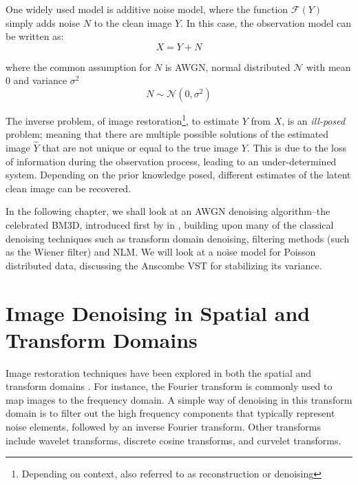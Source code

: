 One widely used model is additive noise model, where the function $\mathcal{F}(Y)$ simply adds noise $N$ to the clean image $Y$. In this case, the observation model can be written as:
\begin{equation}\label{eq:observation-model-additive}
    X = Y + N
\end{equation}

where the common assumption for $N$ is \gls{AWGN}, normal distributed $\mathcal{N}$ with mean \num{0} and variance $\sigma^2$
\begin{equation}\label{eq:awgn}
    N \sim \mathcal{N}(0, \sigma^2)
\end{equation}

The inverse problem, of image restoration\footnote{Depending on context, also referred to as reconstruction or denoising}, to estimate $Y$ from $X$, is an \textit{ill-posed} problem; meaning that there are multiple possible solutions of the estimated image $\hat{Y}$ that are not unique or equal to the true image $Y$. This is due to the loss of information during the observation process, leading to an under-determined system. Depending on the prior knowledge posed, different estimates of the latent clean image can be recovered.

In the following chapter, we shall look at an \gls{AWGN} denoising algorithm--the celebrated \gls{BM3D}, introduced first by \citeauthor{dabovImageDenoisingSparse2007} in \cite{dabovImageDenoisingSparse2007}, building upon many of the classical denoising techniques such as transform domain denoising, filtering methods (such as the Wiener filter) and \gls{NLM}. We will look at a noise model for Poisson distributed data, discussing the Anscombe \gls{VST} for stabilizing its variance.

\section{Image Denoising in Spatial and Transform Domains}
Image restoration techniques have been explored in both the spatial and transform domains \cite{buadesReviewImageDenoising2005,diwakarReviewCTImage2018}. For instance, the Fourier transform is commonly used to map images to the frequency domain. A simple way of denoising in this transform domain is to filter out the high frequency components that typically represent noise elements, followed by an inverse Fourier transform. Other transforms include wavelet transforms, discrete cosine transforms, and curvelet transforms.

